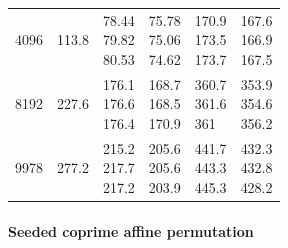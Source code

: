 \begin{longtable}{rrp{2.85cm}p{2.85cm}p{2.85cm}p{2.85cm}}
4096 & 113.8 & \shortstack[r]{78.44\\79.82\\80.53} & \shortstack[r]{75.78\\75.06\\74.62} & \shortstack[r]{170.9\\173.5\\173.7} & \shortstack[r]{167.6\\166.9\\167.5} \\
8192 & 227.6 & \shortstack[r]{176.1\\176.6\\176.4} & \shortstack[r]{168.7\\168.5\\170.9} & \shortstack[r]{360.7\\361.6\\361} & \shortstack[r]{353.9\\354.6\\356.2} \\
9978 & 277.2 & \shortstack[r]{215.2\\217.7\\217.2} & \shortstack[r]{205.6\\205.6\\203.9} & \shortstack[r]{441.7\\443.3\\445.3} & \shortstack[r]{432.3\\432.8\\428.2} \\
\end{longtable}
\endgroup


\paragraph{Seeded coprime affine permutation}

